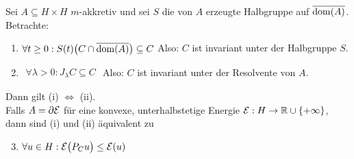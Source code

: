 \begin{theorem}\label{theorem5.3.1}
	Sei $A\subseteq H\times H$ $m$-akkretiv und sei $S$ die von $A$ erzeugte Halbgruppe auf $\overline{\operatorname{dom}(A)}$.
	Betrachte:
	\begin{enumerate}[label=(\roman*)]
		\item $\begin{aligned}
			\forall t\geq0:S(t)\big(C\cap\overline{\operatorname{dom}(A)}\big)\subseteq C
		\end{aligned}$ Also: $C$ ist invariant unter der Halbgruppe $S$.
		 \item $\begin{aligned}
		 	\forall\lambda>0:J_\lambda C\subseteq C
		 \end{aligned}$ Also: $C$ ist invariant unter der Resolvente von $A$.
	\end{enumerate}
	Dann gilt (i) $\Longleftrightarrow$ (ii).\\
	Falls $A=\partial\mathcal{E}$ für eine konvexe, unterhalbstetige Energie $\mathcal{E}:H\to\mathbb{R}\cup\lbrace+\infty\rbrace$, dann sind (i) und (ii) äquivalent zu 
	\begin{enumerate}[label=(\roman*)]
		 \setcounter{enumi}{2}
		\item $\begin{aligned}
			\forall u\in H:\mathcal{E}\big(P_C u\big)\leq\mathcal{E}(u)
		\end{aligned}$
	\end{enumerate}
\end{theorem}

